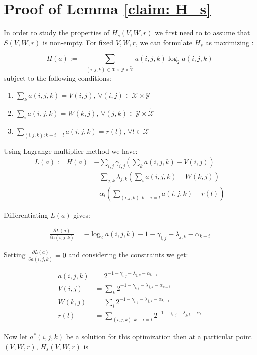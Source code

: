 \section{Proof of Lemma \ref{claim: H_s}}
In order to study the properties of $H_{s}(V,W,r)$ we first need to to assume that $S(V,W,r)$ is non-empty. For fixed $V,W,r$, we can formulate $H_s$ as maximizing :


$$
H(a):=- \sum_{(i,j,k)\in \mathcal{X}\times \mathcal{Y}\times \tilde{\mathcal{X}}} a(i,j,k)\log_2a(i,j,k)
$$
subject to the following conditions:

\begin{enumerate}
\item $\sum_k a(i,j,k)=V(i,j)$, $\forall (i,j)\in \mathcal{X}\times \mathcal{Y}$
\item $\sum_i a(i,j,k)=W(k,j)$, $\forall (j,k) \in \mathcal{Y}\times \tilde{\mathcal{X}}$
\item $\sum_{(i,j,k): k-i=l} a(i,j,k)=r(l)$, $\forall l \in \mathcal{X}$
\end{enumerate}
 Using Lagrange multiplier method we have:
\begin{align*}
L(a):= H(a)&-\sum_{i,j} \gamma_{i,j} (\sum_k a(i,j,k)-V(i,j))\\
&-\sum_{j,k} \lambda_{j,k} (\sum_i a(i,j,k)-W(k,j))\\
&-\alpha_l (\sum_{(i,j,k): k-i=l} a(i,j,k)-r(l))
\end{align*}

Differentiating $L(a)$ gives:

\begin{align*}
\frac{\partial L(a)}{\partial a(i,j,k)}= -\log_2a(i,j,k)-1- \gamma_{i,j} -\lambda_{j,k}-\alpha_{k-i}
\end{align*}

Setting $\frac{\partial L(a)}{\partial a(i,j,k)}=0$ and considering the constraints we get:

\begin{align}\nonumber
a(i,j,k)&=2^{-1- \gamma_{i,j} -\lambda_{j,k}-\alpha_{k-i}}\\\nonumber
V(i,j)&= \sum_k 2^{-1- \gamma_{i,j} -\lambda_{j,k}-\alpha_{k-i}}\\\nonumber
W(k,j)&= \sum_i 2^{-1- \gamma_{i,j} -\lambda_{j,k}-\alpha_{k-i}}\\\label{equ: appx_h_s_lambda...}
r(l)&=\sum_{(i,j,k): k-i=l} 2^{-1- \gamma_{i,j} -\lambda_{j,k}-\alpha_l}
\end{align}

Now let $a^*(i,j,k)$ be a solution for this optimization then at a particular point $(V,W,r)$, $H_{s}(V,W,r)$ is

